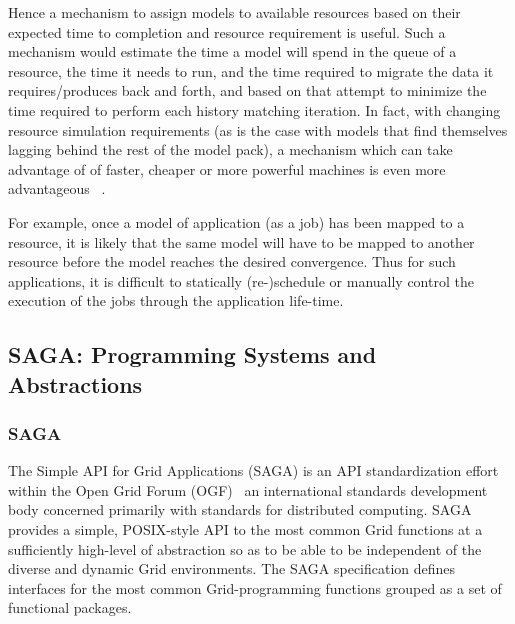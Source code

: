 \documentclass{sig-alternate}
\begin{document}
Hence a mechanism to assign models to available resources based on
their expected time to completion and resource requirement is useful.
Such a mechanism would estimate the time a model will spend in the
queue of a resource, the time it needs to run, and the time required
to migrate the data it requires/produces back and forth, and based on
that attempt to minimize the time required to perform each history
matching iteration.  In fact, with changing resource simulation
requirements (as is the case with models that find themselves lagging
behind the rest of the model pack), a mechanism which can take
advantage of of faster, cheaper or more powerful machines is even more
advantageous ~\cite{escience07}.

For example, once a model of application (as a job) has been mapped to
a resource, it is likely that the same model will have to be mapped to
another resource before the model reaches the desired convergence.
Thus for such applications, it is difficult to statically
(re-)schedule or manually control the execution of the jobs through
the application life-time.


\subsection{SAGA: Programming Systems and Abstractions}


\subsubsection{SAGA}

The Simple API for Grid Applications (SAGA) is an API standardization
effort within the Open Grid Forum (OGF)~\cite{ogf_web} an
international standards development body concerned primarily with
standards for distributed computing.  SAGA provides a simple,
POSIX-style API to the most common Grid functions at a sufficiently
high-level of abstraction so as to be able to be independent of the
diverse and dynamic Grid environments. The SAGA specification defines
interfaces for the most common Grid-programming functions grouped as a
set of functional packages.
\end{document}
